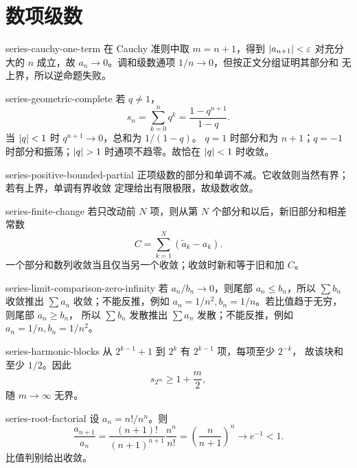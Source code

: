 \chapter{数项级数}
\label{chap:numerical-series-solutions}

\begin{solution}{series-cauchy-one-term}
在 Cauchy 准则中取 \(m=n+1\)，得到
\(\left|a_{n+1}\right|<\varepsilon\) 对充分大的 \(n\) 成立，故
\(a_n\to0\)。调和级数通项 \(1/n\to0\)，但按正文分组证明其部分和
无上界，所以逆命题失败。
\end{solution}

\begin{solution}{series-geometric-complete}
若 \(q\ne1\)，
\[
 s_n=\sum_{k=0}^nq^k=\frac{1-q^{n+1}}{1-q}.
\]
当 \(\left|q\right|<1\) 时 \(q^{n+1}\to0\)，总和为 \(1/(1-q)\)。
\(q=1\) 时部分和为 \(n+1\)；\(q=-1\) 时部分和振荡；\(\abs q>1\)
时通项不趋零。故恰在 \(\left|q\right|<1\) 时收敛。
\end{solution}

\begin{solution}{series-positive-bounded-partial}
正项级数的部分和单调不减。它收敛则当然有界；若有上界，单调有界收敛
定理给出有限极限，故级数收敛。
\end{solution}

\begin{solution}{series-finite-change}
若只改动前 \(N\) 项，则从第 \(N\) 个部分和以后，新旧部分和相差常数
\[
 C=\sum_{k=1}^N(\widetilde a_k-a_k).
\]
一个部分和数列收敛当且仅当另一个收敛；收敛时新和等于旧和加 \(C\)。
\end{solution}

\begin{solution}{series-limit-comparison-zero-infinity}
若 \(a_n/b_n\to0\)，则尾部 \(a_n\le b_n\)，所以
\(\sum b_n\) 收敛推出 \(\sum a_n\) 收敛；不能反推，例如
\(a_n=1/n^2,b_n=1/n\)。若比值趋于无穷，则尾部 \(a_n\ge b_n\)，
所以 \(\sum b_n\) 发散推出 \(\sum a_n\) 发散；不能反推，例如
\(a_n=1/n,b_n=1/n^2\)。
\end{solution}

\begin{solution}{series-harmonic-blocks}
从 \(2^{k-1}+1\) 到 \(2^k\) 有 \(2^{k-1}\) 项，每项至少 \(2^{-k}\)，
故该块和至少 \(1/2\)。因此
\[
 s_{2^m}\ge1+\frac m2,
\]
随 \(m\to\infty\) 无界。
\end{solution}

\begin{solution}{series-root-factorial}
设 \(a_n=n!/n^n\)。则
\[
 \frac{a_{n+1}}{a_n}
 =\frac{(n+1)!}{(n+1)^{n+1}}\frac{n^n}{n!}
 =\left(\frac{n}{n+1}\right)^n\longrightarrow e^{-1}<1.
\]
比值判别给出收敛。
\end{solution}

